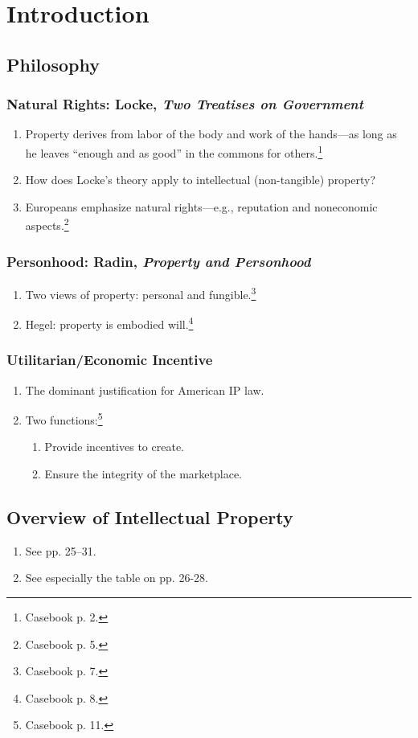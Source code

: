 \section{Introduction}

\subsection{Philosophy}

\subsubsection{Natural Rights: Locke, \emph{Two Treatises on Government}}

\begin{enumerate}
    \item Property derives from labor of the body and work of the 
    hands---as long as he leaves ``enough and as good'' in the commons for 
    others.\footnote{Casebook p. 2.}
    \item How does Locke's theory apply to intellectual (non-tangible) 
    property?
    \item Europeans emphasize natural rights---e.g., reputation and 
    noneconomic aspects.\footnote{Casebook p. 5.}
\end{enumerate}

\subsubsection{Personhood: Radin, \emph{Property and Personhood}}

\begin{enumerate}
    \item Two views of property: personal and fungible.\footnote{Casebook p. 
    7.}
    \item Hegel: property is embodied will.\footnote{Casebook p. 8.}
\end{enumerate}

\subsubsection{Utilitarian/Economic Incentive}

\begin{enumerate}
    \item The dominant justification for American IP law.
    \item Two functions:\footnote{Casebook p. 11.}
    \begin{enumerate}
        \item Provide incentives to create.
        \item Ensure the integrity of the marketplace.
    \end{enumerate}
\end{enumerate}

\subsection{Overview of Intellectual Property}

\begin{enumerate}
    \item See pp. 25--31.
    \item See especially the table on pp. 26-28.
\end{enumerate}
